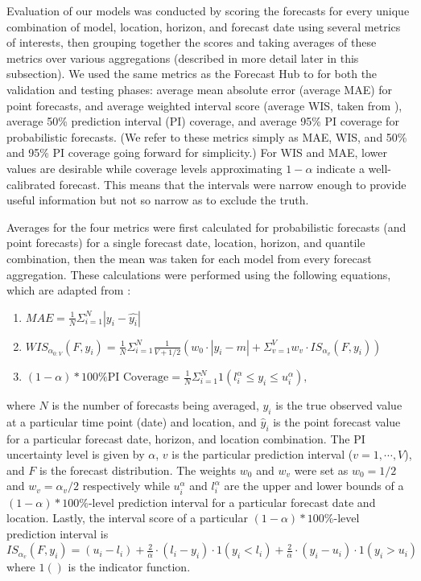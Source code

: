 \documentclass[12pt]{article}
\begin{document}
Evaluation of our models was conducted by scoring the forecasts for every unique combination of model, location, horizon, and forecast date using several metrics of interests, then grouping together the scores and taking averages of these metrics over various aggregations (described in more detail later in this subsection). We used the same metrics as the Forecast Hub to for both the validation and testing phases: average mean absolute error (average MAE) for point forecasts, and average weighted interval score (average WIS, taken from \cite{int_eval}), average 50\% prediction interval (PI) coverage, and average 95\% PI coverage for probabilistic forecasts. (We refer to these metrics simply as MAE, WIS, and 50\% and 95\% PI coverage going forward for simplicity.) For WIS and MAE, lower values are desirable while coverage levels approximating $1-\alpha$ indicate a well-calibrated forecast. This means that the intervals were narrow enough to provide useful information but not so narrow as to exclude the truth.

Averages for the four metrics were first calculated for probabilistic forecasts (and point forecasts) for a single forecast date, location, horizon, and quantile combination, then the mean was taken for each model from every forecast aggregation. These calculations were performed using the following equations, which are adapted from \cite{cramer}:
\begin{enumerate}
\item $MAE = \frac{1}{N} \Sigma_{i=1}^N |y_i-\hat{y_i}|$
\item $WIS_{{\alpha}_{0:V}} (F, y_i) = \frac{1}{N} \Sigma_{i=1}^N \frac{1}{V+1/2}(w_0\cdot |y_i - m| + \Sigma_{v = 1}^V w_v \cdot IS_{{\alpha}_v}(F, y_i))$
\item $(1 - \alpha)*100 \textrm{\% PI Coverage} = \frac{1}{N} \Sigma_{i=1}^N 1(l_i^{\alpha} \leq y_i \leq u_i^{\alpha}),$
\end{enumerate}
where $N$ is the number of forecasts being averaged, $y_i$ is the true observed value at a particular time point (date) and location, and $\hat{y}_i$ is the point forecast value for a particular forecast date, horizon, and location combination. The PI uncertainty level is given by $\alpha$, $v$ is the particular prediction interval ($v = 1, \cdots, V$), and $F$ is the forecast distribution. The weights $w_0$ and $w_v$ were set as $w_0 = 1/2$ and $w_v = \alpha_v/2$ respectively while $u_i^{\alpha}$ and $l_i^{\alpha}$ are the upper and lower bounds of a $(1 - \alpha) * 100\%$-level prediction interval for a particular forecast date and location. Lastly, the interval score of a particular $(1 - \alpha) * 100\%$-level prediction interval is $IS_{{\alpha}_v}(F, y_i) = (u_i-l_i) + \frac{2}{\alpha} \cdot (l_i-y_i) \cdot 1(y_i < l_i) + \frac{2}{\alpha} \cdot (y_i - u_i) \cdot 1(y_i > u_i)$ where $1()$ is the indicator function\cite{cramer}.
\end{document}
